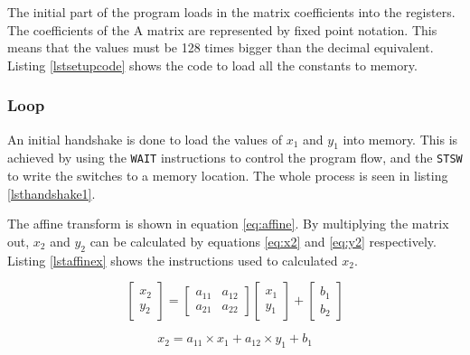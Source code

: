 The initial part of the program loads in the matrix coefficients into the registers. 
The coefficients of the A matrix are represented by fixed point notation. 
This means that the values must be 128 times bigger than the decimal equivalent.
Listing \ref{lstsetupcode} shows the code to load all the constants to memory.




\subsubsection{Loop}

An initial handshake is done to load the values of $x_1$ and $y_1$ into memory. 
This is achieved by using the \texttt{WAIT} instructions to control the program flow, and the \texttt{STSW} to write the switches to a memory location. 
The whole process is seen in listing \ref{lsthandshake1}.




The affine transform is shown in equation \eqref{eq:affine}.
By multiplying the matrix out, $x_2$ and $y_2$ can be calculated by equations \eqref{eq:x2} and \eqref{eq:y2} respectively. 
Listing \ref{lstaffinex} shows the instructions used to calculated $x_2$. 

\begin{equation}\label{eq:affine}
\begin{bmatrix}
x_2 \\
y_2 
\end{bmatrix}
=
\begin{bmatrix}
a_{11} & a_{12} \\
a_{21} & a_{22} 
\end{bmatrix}
\begin{bmatrix}
x_1 \\
y_1
\end{bmatrix}
+
\begin{bmatrix}
b_1 \\
b_2
\end{bmatrix}
\end{equation}

\begin{equation}\label{eq:x2}
x_2 = a_{11} \times x_1 + a_{12} \times y_1 + b_1
\end{equation}

